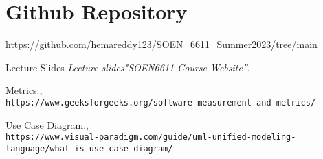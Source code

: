 \documentclass[12pt,letterpaper]{report}
\begin{document}
\section{Github Repository}

https://github.com/hemareddy123/SOEN\_6611\_Summer2023/tree/main



\begin{thebibliography}{7}

    
    Lecture Slides 
    \textit{Lecture slides"SOEN6611 Course Website”}.     
    
    Metrics.,
    \\\texttt{https://www.geeksforgeeks.org/software-measurement-and-metrics/}
    
    Use Case Diagram.,
    \\\texttt{https://www.visual-paradigm.com/guide/uml-unified-modeling-language/what is use case diagram/}

 
    

    
\end{thebibliography}
\end{document}
